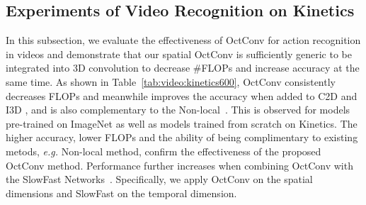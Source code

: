 \documentclass[10pt,twocolumn,letterpaper]{article}
\newcommand{\hiConv}[0]{OctConv\xspace}
\begin{document}
\subsection{Experiments of Video Recognition on Kinetics}
\label{sec:exp:video}


In this subsection, we evaluate the effectiveness of \hiConv for action recognition in videos and demonstrate that our spatial \hiConv is sufficiently generic to be integrated into 3D convolution to decrease \#FLOPs and increase accuracy at the same time.
As shown in Table~\ref{tab:video:kinetics600}, \hiConv consistently decreases FLOPs and meanwhile improves the accuracy when added to C2D and I3D \cite{nonlocal,nonlocal-git}, and is also complementary to the Non-local~\cite{nonlocal}.
This is observed for models pre-trained on ImageNet \cite{imagenet} as well as models trained from scratch on Kinetics. The higher accuracy, lower FLOPs and the ability of being complimentary to existing metods, \emph{e.g.} Non-local method, confirm the effectiveness of the proposed \hiConv method. Performance further increases when combining \hiConv with the SlowFast Networks~\cite{SlowFast}. Specifically, we apply \hiConv on the spatial dimensions and SlowFast on the temporal dimension. 
\end{document}
